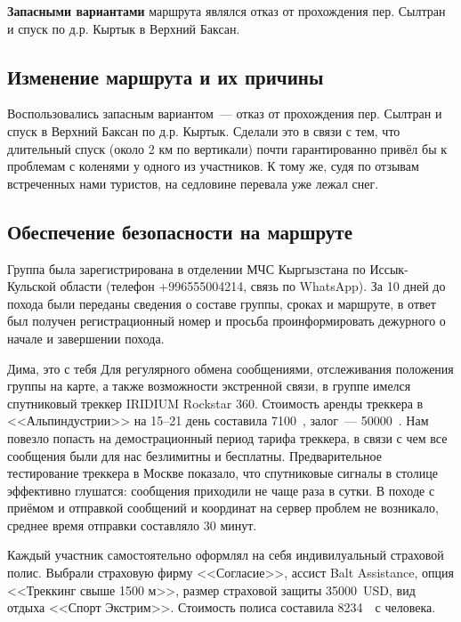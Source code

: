 \textbf{Запасными вариантами} маршрута являлся отказ от прохождения пер. Сылтран и спуск по д.р. Кыртык в Верхний Баксан.


\subsection{Изменение маршрута и их причины}
Воспользовались запасным вариантом~--- отказ от прохождения пер. Сылтран и спуск в Верхний Баксан по д.р. Кыртык. Сделали это в связи с тем, что длительный спуск (около 2 км по вертикали) почти гарантированно привёл бы к проблемам с коленями у одного из участников. К тому же, судя по отзывам встреченных нами туристов, на седловине перевала уже лежал снег.
\subsection{Обеспечение безопасности на маршруте}
Группа была зарегистрирована в отделении МЧС Кыргызстана по Иссык-Кульской области (телефон +996555004214, связь по WhatsApp). За 10 дней до похода были переданы сведения о составе группы, сроках и маршруте, в ответ был получен регистрационный номер и просьба проинформировать дежурного о начале и завершении похода.

\alert{Дима, это с тебя Для регулярного обмена сообщениями, отслеживания положения группы на карте, а также возможности экстренной связи, в группе имелся спутниковый треккер IRIDIUM Rockstar 360. Стоимость аренды треккера в <<Альпиндустрии>> на 15--21 день составила 7100~\faRub, залог~--- 50000~\faRub. Нам повезло попасть на демострационный период тарифа треккера, в связи с чем все сообщения были для нас безлимитны и бесплатны. Предварительное тестирование треккера в Москве показало, что спутниковые сигналы в столице эффективно глушатся: сообщения приходили не чаще раза в сутки. В походе с приёмом и отправкой сообщений и координат на сервер проблем не возникало, среднее время отправки составляло 30 минут.}

Каждый участник самостоятельно оформлял на себя индивилуальный страховой полис. Выбрали страховую фирму <<Согласие>>, ассист Balt Assistance, опция <<Треккинг свыше 1500 м>>, размер страховой защиты 35000~USD,  вид отдыха <<Спорт Экстрим>>. Стоимость полиса составила 8234~\faRuble~с человека.

